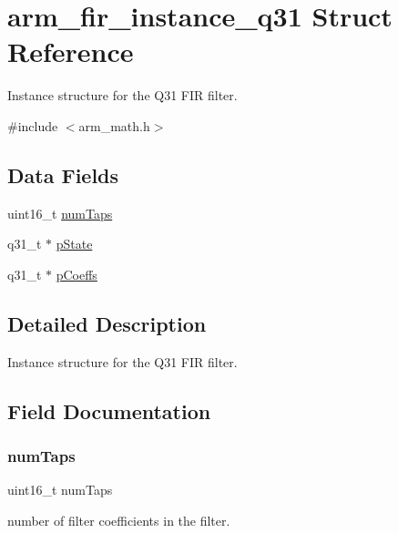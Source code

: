 \hypertarget{structarm__fir__instance__q31}{}\section{arm\+\_\+fir\+\_\+instance\+\_\+q31 Struct Reference}
\label{structarm__fir__instance__q31}


Instance structure for the Q31 F\+IR filter.  




{\ttfamily \#include $<$arm\+\_\+math.\+h$>$}

\subsection*{Data Fields}
\begin{DoxyCompactItemize}
\item 
uint16\+\_\+t \hyperlink{structarm__fir__instance__q31_a751941891e47f522a7f5375fe8990aac}{num\+Taps}
\item 
q31\+\_\+t $\ast$ \hyperlink{structarm__fir__instance__q31_adee4ba3ee8869865af7d8fa08ca913d6}{p\+State}
\item 
q31\+\_\+t $\ast$ \hyperlink{structarm__fir__instance__q31_a68888e36167d81cb7836db10367a1682}{p\+Coeffs}
\end{DoxyCompactItemize}


\subsection{Detailed Description}
Instance structure for the Q31 F\+IR filter. 

\subsection{Field Documentation}
\mbox{\label{structarm__fir__instance__q31_a751941891e47f522a7f5375fe8990aac}} 
\subsubsection{\texorpdfstring{num\+Taps}{numTaps}}
{\footnotesize\ttfamily uint16\+\_\+t num\+Taps}

number of filter coefficients in the filter. \mbox{\label{structarm__fir__instance__q31_a68888e36167d81cb7836db10367a1682}} 
